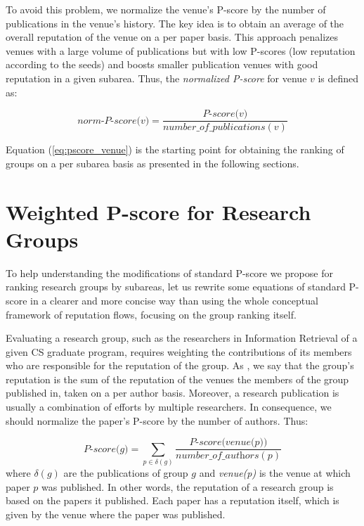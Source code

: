 \documentclass[msc]{ppgccufmg}
\begin{document}
To avoid this problem, we normalize the venue's P-score by the number of publications in the venue's history. The key idea is to obtain an average of the overall reputation of the venue on a per paper basis. This approach penalizes venues with a large volume of publications but with low P-scores (low reputation according to the seeds) and boosts smaller publication venues with good reputation in a given subarea. Thus, the \textit{normalized P-score} for venue $v$ is defined as: 

\begin{equation}\label{eq:pscore_venue}
    \textit{norm-P-score($v$)} = \frac{\textit{P-score($v$)}}{\textit{number\_of\_publications}(v)}
\end{equation}

Equation (\ref{eq:pscore_venue}) is the starting point for obtaining the ranking of groups on a per subarea basis as presented in the following sections. 


\section{Weighted P-score for Research Groups}\label{sec:wpscore}


To help understanding the modifications of standard P-score we propose for ranking research groups by subareas, let us rewrite some equations of standard P-score in a clearer and more concise way than using the whole conceptual framework of reputation flows, focusing on the group ranking itself.

Evaluating a research group, such as the researchers in Information Retrieval of a given CS graduate program, requires weighting the contributions of its members who are responsible for the reputation of the group. As \citeauthor{ribas2015random}, we say that the group's reputation is the sum of the reputation of the venues the members of the group published in, taken on a per author basis. Moreover, a research publication is usually a combination of efforts by multiple researchers. In consequence, we should normalize the paper's P-score by the number of authors. 
Thus:

\begin{equation}\label{eq:pscore_group}
    \textit{P-score($g$)} = \sum_{p \in \delta(g)} \frac{\textit{P-score(venue(p))}}{\textit{number\_of\_authors}(p)}
\end{equation}
where $\delta(g)$ are the publications of group $g$ and \textit{venue(p)} is the venue at which paper $p$ was published.
%
In other words, the reputation of a research group is based on the papers it published. Each paper has a reputation itself, which is given by the venue where the paper was published. 
\end{document}
